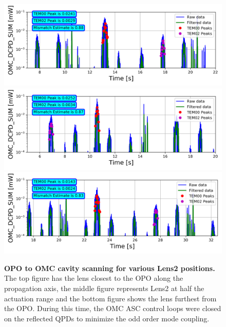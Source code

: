 	
	\begin{figure}[t!]
		\centering
		\includegraphics[width=0.8 \textwidth]{../Figures/Lens_Closest_to_OPO.png}
		\includegraphics[width=0.8 \textwidth]{../Figures/Lens_in_Center_Position.png}
		\includegraphics[width=0.8 \textwidth]{../Figures/Lens_Furthest_from_OPO.png}
		\caption[OPO to OMC cavity scanning for various Lens2 positions.]  
		{\textbf{OPO to OMC cavity scanning for various Lens2 positions.}  The top figure has the lens closest to the OPO along the propagation axis, the middle figure represents Lens2 at half the actuation range and the bottom figure shows the lens furthest from the OPO.  During this time, the OMC ASC control loops were closed on the reflected QPDs to minimize the odd order mode coupling.  
		}
		\label{fig:OPO_to_OMC_Old}
	\end{figure}